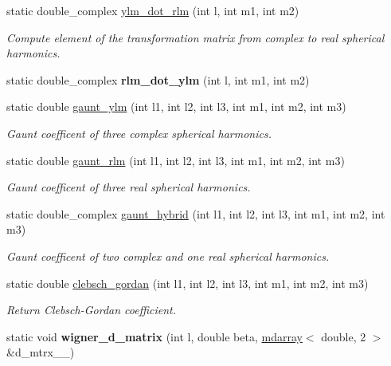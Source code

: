 \begin{DoxyCompactItemize}
static double\+\_\+complex \hyperlink{classsirius_1_1_s_h_t_aa38aca8ae726b9666cea92805b615e9c}{ylm\+\_\+dot\+\_\+rlm} (int l, int m1, int m2)
\begin{DoxyCompactList}\small\item\em Compute element of the transformation matrix from complex to real spherical harmonics. \end{DoxyCompactList}\item 
\hypertarget{classsirius_1_1_s_h_t_ab8a78b5dc61a82af0ceac4bce78394dd}{}static double\+\_\+complex {\bfseries rlm\+\_\+dot\+\_\+ylm} (int l, int m1, int m2)\label{classsirius_1_1_s_h_t_ab8a78b5dc61a82af0ceac4bce78394dd}

\item 
static double \hyperlink{classsirius_1_1_s_h_t_a8d7ae1a98014c49a680b83e16578a2e8}{gaunt\+\_\+ylm} (int l1, int l2, int l3, int m1, int m2, int m3)
\begin{DoxyCompactList}\small\item\em Gaunt coefficent of three complex spherical harmonics. \end{DoxyCompactList}\item 
static double \hyperlink{classsirius_1_1_s_h_t_a868f08f5f0804568d36747809fd515c2}{gaunt\+\_\+rlm} (int l1, int l2, int l3, int m1, int m2, int m3)
\begin{DoxyCompactList}\small\item\em Gaunt coefficent of three real spherical harmonics. \end{DoxyCompactList}\item 
static double\+\_\+complex \hyperlink{classsirius_1_1_s_h_t_a4a03c2f21df84906c12a70e6cbfecadb}{gaunt\+\_\+hybrid} (int l1, int l2, int l3, int m1, int m2, int m3)
\begin{DoxyCompactList}\small\item\em Gaunt coefficent of two complex and one real spherical harmonics. \end{DoxyCompactList}\item 
static double \hyperlink{classsirius_1_1_s_h_t_af05f3481984bab06cbaf69cdde2cab58}{clebsch\+\_\+gordan} (int l1, int l2, int l3, int m1, int m2, int m3)
\begin{DoxyCompactList}\small\item\em Return Clebsch-\/\+Gordan coefficient. \end{DoxyCompactList}\item 
\hypertarget{classsirius_1_1_s_h_t_a949e473fa117e1b6f371e468c5dd4c55}{}static void {\bfseries wigner\+\_\+d\+\_\+matrix} (int l, double beta, \hyperlink{classsddk_1_1mdarray}{mdarray}$<$ double, 2 $>$ \&d\+\_\+mtrx\+\_\+\+\_\+)\label{classsirius_1_1_s_h_t_a949e473fa117e1b6f371e468c5dd4c55}


\end{DoxyCompactItemize}
